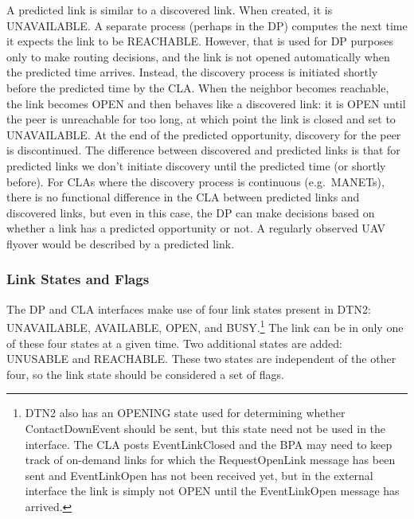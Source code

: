 \documentclass[11pt]{article}
\begin{document}
A predicted link is similar to a discovered link. When created, it is
UNAVAILABLE. A separate process (perhaps in the DP) computes the next time it
expects the link to be REACHABLE. However,
that is used for DP purposes only to make routing decisions, and the link is
not opened automatically when the predicted time arrives. Instead, the
discovery process
is initiated shortly before the predicted time by the CLA.
When the neighbor becomes reachable, the link becomes OPEN and then behaves
like a discovered link: it is OPEN until the peer is unreachable for too long,
at which point the link is closed and set to UNAVAILABLE. At the end of the
predicted opportunity, discovery for the peer is discontinued. The difference
between discovered and predicted links is that for predicted links we don't
initiate discovery until the predicted time (or shortly before). For CLAs where
the discovery process is continuous (e.g.\ MANETs), there is no functional
difference in the CLA between predicted links and discovered links, but even in
this case, the DP can make decisions based on whether a link has a predicted
opportunity or not. A regularly observed UAV flyover would be described
by a predicted link.

\subsubsection{Link States and Flags} \label{sec:linkstates}

The DP and CLA interfaces make use of four link states present in DTN2:
UNAVAILABLE, AVAILABLE, OPEN, and BUSY.\footnote{DTN2 also has an OPENING state
used for determining whether ContactDownEvent should be sent, but this state
need not be used in the interface. The CLA posts EventLinkClosed and the BPA
may need to keep track of on-demand links for which the RequestOpenLink message
has been sent and EventLinkOpen has not been received yet, but in the external
interface the link is simply not OPEN until the EventLinkOpen message has
arrived.} The link can be in only one of these four states at a given time. Two
additional states are added: UNUSABLE and REACHABLE. These two states are
independent of the other four, so the link state should be considered a set of
flags.
\end{document}
